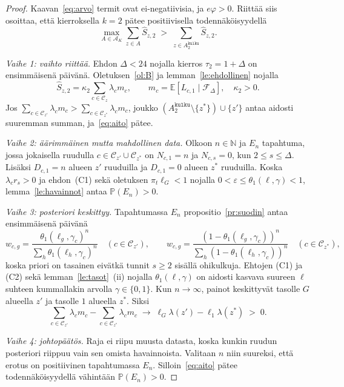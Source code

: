 \documentclass[11pt,a4paper]{article}
\theoremstyle{plain}
\theoremstyle{definition}
\theoremstyle{remark}
\newcommand{\E}{\mathbb{E}}
\renewcommand{\P}{\mathbb{P}}
\newcommand{\cC}{\mathcal{C}}
\newcommand{\cF}{\mathcal{F}}
\newcommand{\cA}{\mathcal{A}}
\newcommand{\1}{\mathbf{1}}
\newcommand{\pol}[1]{\texttt{#1}}
\begin{document}
\begin{proof}
Kaavan~\eqref{eq:arvo} termit ovat ei-negatiivisia, ja $e\varphi > 0$. Riittää
siis osoittaa, että kierroksella $k = 2$ pätee positiivisella todennäköisyydellä
\begin{equation}\label{eq:aito}
  \max_{A \in \cA_K}\sum_{z \in A}\hat S_{z,2} \;>\; \sum_{z \in A^{\pol{kulku}}_2}\hat S_{z,2}.
\end{equation}

\emph{Vaihe 1: vaihto riittää.} Ehdon $\Delta < 24$ nojalla kierros
$\tau_2 = 1 + \Delta$ on ensimmäisenä päivänä. Oletuksen~\ref{ol:B} ja
lemman~\ref{le:ehdollinen} nojalla
\[
  \hat S_{z,2} = \kappa_2 \sum_{c \in \cC_z}\lambda_c m_c,
  \qquad m_c = \E[L_{c,1} \mid \cF_{\Delta}],\quad \kappa_2 > 0.
\]
Jos $\sum_{c \in \cC_{z'}}\lambda_c m_c > \sum_{c \in \cC_{z^\ast}}\lambda_c m_c$,
joukko $(A^{\pol{kulku}}_2 \setminus\{z^\ast\}) \cup \{z'\}$ antaa aidosti
suuremman summan, ja~\eqref{eq:aito} pätee.

\emph{Vaihe 2: äärimmäinen mutta mahdollinen data.} Olkoon $n \in \mathbb{N}$ ja
$E_n$ tapahtuma, jossa jokaisella ruudulla $c \in \cC_{z'} \cup \cC_{z^\ast}$
on $N_{c,1} = n$ ja $N_{c,s} = 0$, kun $2 \le s \le \Delta$. Lisäksi
$D_{c,1} = n$ alueen $z'$ ruuduilla ja $D_{c,1} = 0$ alueen $z^\ast$ ruuduilla.
Koska $\lambda_c r_s > 0$ ja ehdon~(C1) sekä oletuksen $\pi_t\ell_G < 1$ nojalla
$0 < \varepsilon \le \theta_1(\ell, \gamma) < 1$, lemma~\ref{le:havainnot}
antaa $\P(E_n) > 0$.

\emph{Vaihe 3: posteriori keskittyy.} Tapahtumassa $E_n$
propositio~\ref{pr:suodin} antaa ensimmäisenä päivänä
\[
  w_{c,g} = \frac{\theta_1(\ell_g,\gamma_c)^n}{\sum_h \theta_1(\ell_h,\gamma_c)^n}
  \quad (c \in \cC_{z'}),
  \qquad
  w_{c,g} = \frac{(1-\theta_1(\ell_g,\gamma_c))^n}{\sum_h (1-\theta_1(\ell_h,\gamma_c))^n}
  \quad (c \in \cC_{z^\ast}),
\]
koska priori on tasainen eivätkä tunnit $s \ge 2$ sisällä ohikulkuja. Ehtojen
(C1) ja (C2) sekä lemman~\ref{le:tasot}~(ii) nojalla $\theta_1(\ell, \gamma)$ on
aidosti kasvava suureen $\ell$ suhteen kummallakin arvolla $\gamma \in \{0, 1\}$.
Kun $n \to \infty$, painot keskittyvät tasolle $G$ alueella $z'$ ja tasolle $1$
alueella $z^\ast$. Siksi
\[
  \sum_{c \in \cC_{z'}}\lambda_c m_c - \sum_{c \in \cC_{z^\ast}}\lambda_c m_c
  \;\longrightarrow\; \ell_G\lambda(z') - \ell_1\lambda(z^\ast) \;>\; 0.
\]

\emph{Vaihe 4: johtopäätös.} Raja ei riipu muusta datasta, koska kunkin ruudun
posteriori riippuu vain sen omista havainnoista. Valitaan $n$ niin suureksi,
että erotus on positiivinen tapahtumassa $E_n$. Silloin~\eqref{eq:aito} pätee
todennäköisyydellä vähintään $\P(E_n) > 0$.
\end{proof}
\end{document}
